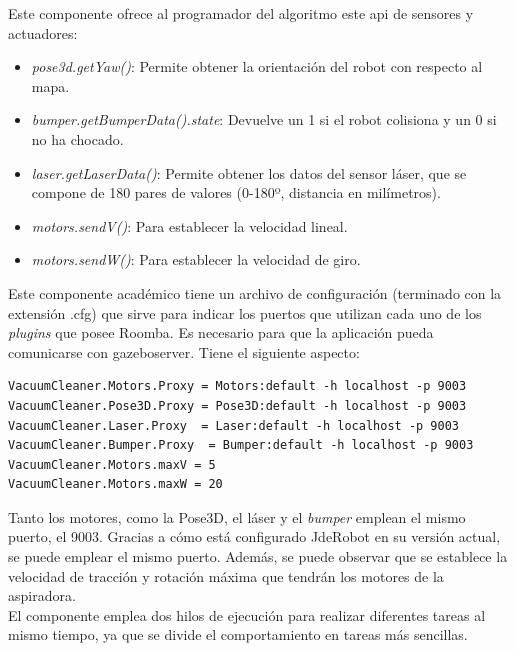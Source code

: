 Este componente ofrece al programador del algoritmo este \acrshort{api} de sensores y actuadores:

\begin{itemize}
\item \textit{pose3d.getYaw()}: Permite obtener la orientación del robot con respecto al mapa.
\item \textit{bumper.getBumperData().state}: Devuelve un 1 si el robot colisiona y un 0 si no ha chocado.
\item \textit{laser.getLaserData()}: Permite obtener los datos del sensor láser, que se compone de 180 pares de valores (0-180º, distancia en milímetros).
\item \textit{motors.sendV()}: Para establecer la velocidad lineal.
\item \textit{motors.sendW()}: Para establecer la velocidad de giro.

\end{itemize}


Este componente académico tiene un archivo de configuración (terminado con la extensión .cfg) que sirve para indicar los puertos que utilizan cada uno de los \textit{plugins} que posee Roomba. Es necesario para que la aplicación pueda comunicarse con gazeboserver. Tiene el siguiente aspecto: 


\vspace{20pt}
	\begin{lstlisting}[frame=single]
VacuumCleaner.Motors.Proxy = Motors:default -h localhost -p 9003
VacuumCleaner.Pose3D.Proxy = Pose3D:default -h localhost -p 9003
VacuumCleaner.Laser.Proxy  = Laser:default -h localhost -p 9003
VacuumCleaner.Bumper.Proxy  = Bumper:default -h localhost -p 9003
VacuumCleaner.Motors.maxV = 5
VacuumCleaner.Motors.maxW = 20

	\end{lstlisting}
	
Tanto los motores, como la Pose3D, el láser y el \textit{bumper} emplean el mismo puerto, el 9003. Gracias a cómo está configurado JdeRobot en su versión actual, se puede emplear el mismo puerto. Además, se puede observar que se establece la velocidad de tracción y rotación máxima que tendrán los motores de la aspiradora.\\

El componente emplea dos hilos de ejecución para realizar diferentes tareas al mismo tiempo, ya que se divide el comportamiento en tareas más sencillas.

